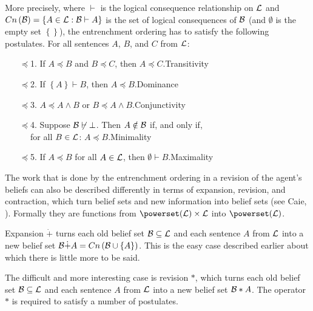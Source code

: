 More precisely, where $\vdash$ is the logical consequence relationship on $\cal L$ and $Cn\left(\cal B\right)=\left\{A\in\begin{cal}L\end{cal}:\begin{cal}B\end{cal}\vdash A\right\}$ is the set of logical consequences of $\cal B$ (and $\emptyset$ is the empty set $\left\{\right\}$), the entrenchment ordering has to satisfy the following postulates. For all sentences $A$, $B$, and $C$ from $\cal L$:
\begin{enumerate}
\item[$\preceq$1.] If $A\preceq B$ and $B\preceq C$, then $A\preceq C$.\hfill Transitivity
\item[$\preceq$2.] If $\left\{A\right\}\vdash B$, then $A\preceq B$.\hfill Dominance
\item[$\preceq$3.] $A\preceq A\wedge B$ or $B\preceq A\wedge B$.\hfill Conjunctivity
\item[$\preceq$4.] Suppose $\begin{cal}B\end{cal}\not\vdash\bot$. Then $A\notin\cal B$ if, and only if,\\$\phantom{M}$\hspace{1em} for all $B\in\cal L$: $A\preceq B$.\hfill Minimality
\item[$\preceq$5.] If $A\preceq B$ for all $A\in\cal L$, then $\emptyset\vdash B$.\hfill Maximality
\end{enumerate}

The work that is done by the entrenchment ordering in a revision of the agent's beliefs can also be described differently in terms of expansion, revision, and contraction, which turn belief sets and new information into belief sets (see Caie, ). Formally they are functions from $\powerset\!\left(\cal L\right)\times\cal L$ into $\powerset\!\left(\cal L\right)$.

Expansion $\dot+$ turns each old belief set $\cal B\subseteq L$ and each sentence $A$ from $\cal L$ into a new belief set $\begin{cal}B\end{cal}\dot+A=Cn\left(\begin{cal}B\end{cal}\cup\left\{A\right\}\right)$. This is the easy case described earlier about which there is little more to be said.

The difficult and more interesting case is revision $*$, which turns each old belief set $\cal B\subseteq L$ and each sentence $A$ from $\cal L$ into a new belief set $\begin{cal}B\end{cal}*A$. The operator $*$ is required to satisfy a number of postulates.

